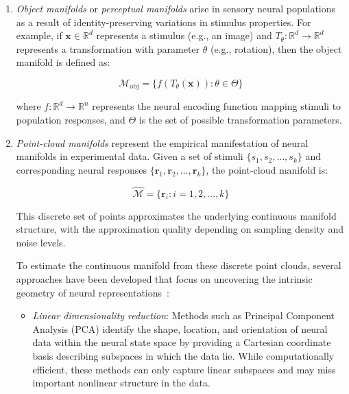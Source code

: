 \documentclass[11pt,a4paper]{article}
\begin{document}
\begin{enumerate}
    \item \textit{Object manifolds} or \textit{perceptual manifolds} arise in sensory neural populations as a result of identity-preserving variations in stimulus properties. For example, if $\mathbf{x} \in \mathbb{R}^d$ represents a stimulus (e.g., an image) and $T_\theta: \mathbb{R}^d \rightarrow \mathbb{R}^d$ represents a transformation with parameter $\theta$ (e.g., rotation), then the object manifold is defined as:
    
    \begin{equation}
    \mathcal{M}_{\text{obj}} = \{f(T_\theta(\mathbf{x})) : \theta \in \Theta\}
    \end{equation}
    
    where $f: \mathbb{R}^d \rightarrow \mathbb{R}^n$ represents the neural encoding function mapping stimuli to population responses, and $\Theta$ is the set of possible transformation parameters.
    
    \item \textit{Point-cloud manifolds} represent the empirical manifestation of neural manifolds in experimental data. Given a set of stimuli $\{s_1, s_2, \ldots, s_k\}$ and corresponding neural responses $\{\mathbf{r}_1, \mathbf{r}_2, \ldots, \mathbf{r}_k\}$, the point-cloud manifold is:
    
    \begin{equation}
    \hat{\mathcal{M}} = \{\mathbf{r}_i : i = 1, 2, \ldots, k\}
    \end{equation}
    
    This discrete set of points approximates the underlying continuous manifold structure, with the approximation quality depending on sampling density and noise levels.
    
    To estimate the continuous manifold from these discrete point clouds, several approaches have been developed that focus on uncovering the intrinsic geometry of neural representations~\cite{chung2021neural}:
    
    \begin{itemize}
        \item \textit{Linear dimensionality reduction}: Methods such as Principal Component Analysis (PCA) identify the shape, location, and orientation of neural data within the neural state space by providing a Cartesian coordinate basis describing subspaces in which the data lie. While computationally efficient, these methods can only capture linear subspaces and may miss important nonlinear structure in the data.
        

\end{itemize}
\end{enumerate}
\end{document}
